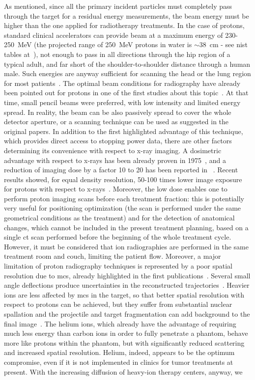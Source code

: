 As mentioned, since all the primary incident particles must completely pass through the target for a residual energy measurements, the beam energy must be higher than the one applied for radiotherapy treatments. In the case of protons, standard clinical accelerators can provide beam at a maximum energy of 230-250~MeV (the projected range of 250~MeV protons in water is $\sim$38~cm - see \gls{nist} tables at~\cite{NISTpstar}), not enough to pass in all directions through the hip region of a typical adult, and far short of the shoulder-to-shoulder distance through a human male. Such energies are anyway sufficient for scanning the head or the lung region for most patients~\parencite{Johnson2017}. The optimal beam conditions for radiography have already been pointed out for protons in one of the first studies about this topic~\parencite{Moffett1975}. At that time, small pencil beams were preferred, with low intensity and limited energy spread. In reality, the beam can be also passively spread to cover the whole detector aperture, or a scanning technique can be used as suggested in the original papers. In addition to the first highlighted advantage of this technique, which provides direct access to stopping power data, there are other factors determining its convenience with respect to x-ray imaging. A dosimetric advantage with respect to x-rays has been already proven in 1975~\parencite{Moffett1975}, and a reduction of imaging dose by a factor 10 to 20 has been reported in ~\cite{Schneider1995}. Recent results showed, for equal density resolution, 50-100 times lower image exposure for protons with respect to x-rays~\parencite{Schneider2004}. Moreover, the low dose enables one to perform proton imaging scans before each treatment fraction: this is potentially very useful for positioning optimization (the scan is performed under the same geometrical conditions as the treatment) and for the detection of anatomical changes, which cannot be included in the present treatment planning, based on a single \gls{ct} scan performed before the beginning of the whole treatment cycle. However, it must be considered that ion radiographies are performed in the same treatment room and couch, limiting the patient flow. Moreover, a major limitation of proton radiography techniques is represented by a poor spatial resolution due to \gls{mcs}, already highlighted in the first publications~\parencite{Koehler1968, Moffett1975}. Several small angle deflections produce uncertainties in the reconstructed trajectories~\parencite{Schneider1995, Schneider2004, Penfold2009}. Heavier ions are less affected by \gls{mcs} in the target, so that better spatial resolution with respect to protons can be achieved, but they suffer from substantial nuclear spallation and the projectile and target fragmentation can add background to the final image~\parencite{Parodi2014}. The helium ions, which already have the advantage of requiring much less energy than carbon ions in order to fully penetrate a phantom, behave more like protons within the phantom, but with significantly reduced scattering and increased spatial resolution. Helium, indeed, appears to be the optimum compromise, even if it is not implemented in clinics for tumor treatments at present. With the increasing diffusion of heavy-ion therapy centers, anyway, we 